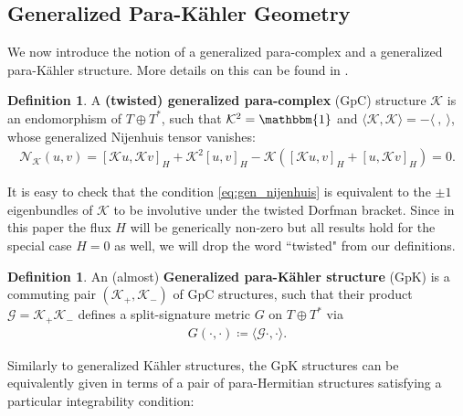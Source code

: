 \documentclass{article}
\newcommand{\TT}{{T\oplus T^*}}
\newcommand{\KK}{\mathcal{K}}
\newcommand{\GG}{\mathcal{G}}
\newcommand{\id}{\mathbbm{1}}
\newcommand{\la}{\langle}
\newcommand{\ra}{\rangle}
\newcommand{\lara}{\la\ ,\ \ra}
\theoremstyle{definition}
\newtheorem{Def}[theorem]{Definition}
\theoremstyle{definition}
\theoremstyle{remark}
\begin{document}
\subsection{Generalized Para-K\"ahler Geometry}
We now introduce the notion of a generalized para-complex and a generalized para-K\"ahler structure. More details on this can be found in \cite{inprogress}.
\begin{Def}
A \textbf{(twisted) generalized para-complex} (GpC) structure $\KK$ is an endomorphism of $\TT$, such that $\KK^2=\id$ and $\la\KK,\KK\ra=-\lara$, whose generalized Nijenhuis tensor vanishes:
\begin{align}\label{eq:gen_nijenhuis}
\mathcal{N}_\KK(u,v)=[\KK u,\KK v]_H+\KK^2[ u,v]_H-\KK([\KK u,v]_H+[ u,\KK v]_H)=0.
\end{align}
\end{Def}
It is easy to check that the condition \eqref{eq:gen_nijenhuis} is equivalent to the $\pm 1$ eigenbundles of $\KK$ to be involutive under the twisted Dorfman bracket. Since in this paper the flux $H$ will be generically non-zero but all results hold for the special case $H=0$ as well, we will drop the word ``twisted" from our definitions.
\begin{Def}
An (almost) \textbf{Generalized para-K\"ahler structure} (GpK) is a commuting pair $(\KK_+,\KK_-)$ of GpC structures, such that their product $\GG=\KK_+\KK_-$ defines a split-signature metric $G$ on $\TT$ via
\begin{align*}
G(\cdot,\cdot)\coloneqq \la \GG\cdot,\cdot\ra.
\end{align*}
\end{Def}
Similarly to generalized K\"ahler structures, the GpK structures can be equivalently given in terms of a pair of para-Hermitian structures satisfying a particular integrability condition:
\end{document}
